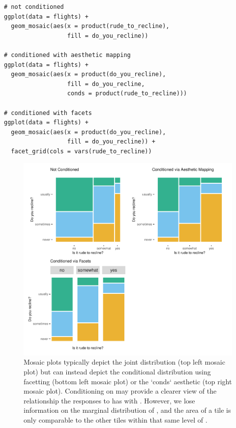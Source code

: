\begin{verbatim}
# not conditioned
ggplot(data = flights) +
  geom_mosaic(aes(x = product(rude_to_recline), 
                  fill = do_you_recline))

# conditioned with aesthetic mapping
ggplot(data = flights) +
  geom_mosaic(aes(x = product(do_you_recline), 
                  fill = do_you_recline, 
                  conds = product(rude_to_recline)))

# conditioned with facets
ggplot(data = flights) +
  geom_mosaic(aes(x = product(do_you_recline), 
                  fill = do_you_recline)) +
  facet_grid(cols = vars(rude_to_recline))
\end{verbatim}

\begin{figure}

{\centering \includegraphics[width=1\linewidth]{RJ-2023-013_files/figure-latex/conds-1} 

}

\caption{Mosaic plots typically depict the joint distribution (top left mosaic plot) but can instead depict the conditional distribution using facetting (bottom left mosaic plot) or the `conds` aesthetic (top right mosaic plot). Conditioning on  may provide a clearer view of the relationship the responses to  has with . However, we lose information on the marginal distribution of , and the area of a tile is only comparable to the other tiles within that same level of .}\label{fig:conds}
\end{figure}

